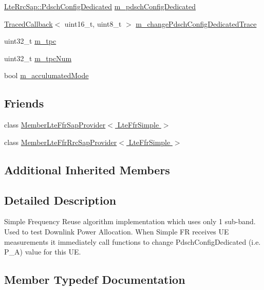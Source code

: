 \begin{DoxyCompactItemize}
\item 
\hyperlink{structns3_1_1LteRrcSap_1_1PdschConfigDedicated}{Lte\+Rrc\+Sap\+::\+Pdsch\+Config\+Dedicated} \hyperlink{classns3_1_1LteFfrSimple_a05c1fbffbe85e713bb7047330087f3ba}{m\+\_\+pdsch\+Config\+Dedicated}
\item 
\hyperlink{classns3_1_1TracedCallback}{Traced\+Callback}$<$ uint16\+\_\+t, uint8\+\_\+t $>$ \hyperlink{classns3_1_1LteFfrSimple_ae9c3c4775a8ed9296cb56f2011e6a31a}{m\+\_\+change\+Pdsch\+Config\+Dedicated\+Trace}
\item 
uint32\+\_\+t \hyperlink{classns3_1_1LteFfrSimple_a4b90cbf9b1c42c89c7c0de0cdc33fbe0}{m\+\_\+tpc}
\item 
uint32\+\_\+t \hyperlink{classns3_1_1LteFfrSimple_a718e4d1cc4ae6b3d2c62119c032ce3f8}{m\+\_\+tpc\+Num}
\item 
bool \hyperlink{classns3_1_1LteFfrSimple_ad60c3c8c81ac0d6cdd8681d2eac906e9}{m\+\_\+acculumated\+Mode}
\end{DoxyCompactItemize}
\subsection*{Friends}
\begin{DoxyCompactItemize}
\item 
class \hyperlink{classns3_1_1LteFfrSimple_a6eaf12f6aafce3470959dfc786ebe642}{Member\+Lte\+Ffr\+Sap\+Provider$<$ Lte\+Ffr\+Simple $>$}
\item 
class \hyperlink{classns3_1_1LteFfrSimple_a643bcf138ea192693166a16c947828e6}{Member\+Lte\+Ffr\+Rrc\+Sap\+Provider$<$ Lte\+Ffr\+Simple $>$}
\end{DoxyCompactItemize}
\subsection*{Additional Inherited Members}


\subsection{Detailed Description}
Simple Frequency Reuse algorithm implementation which uses only 1 sub-\/band. Used to test Downlink Power Allocation. When Simple FR receives UE measurements it immediately call functions to change Pdsch\+Config\+Dedicated (i.\+e. P\+\_\+A) value for this UE. 

\subsection{Member Typedef Documentation}
